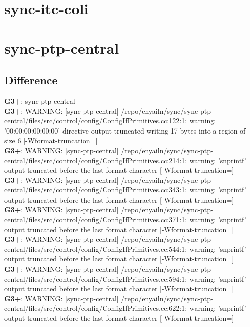 \documentclass[12pt,twoside]{article}
\begin{document}
\section{sync-itc-coli} 
  
\section{sync-ptp-central} 
\subsection{Difference} 
  
\textbf{G3+}: sync-ptp-central\\ 
\textbf{G3+}: WARNING: [sync-ptp-central] /repo/enyailn/sync/sync-ptp-central/files/src/control/config/ConfigIfPrimitives.cc:122:1: warning: '00:00:00:00:00:00' directive output truncated writing 17 bytes into a region of size 6 [-Wformat-truncation=]\\ 
\textbf{G3+}: WARNING: [sync-ptp-central] /repo/enyailn/sync/sync-ptp-central/files/src/control/config/ConfigIfPrimitives.cc:214:1: warning: 'snprintf' output truncated before the last format character [-Wformat-truncation=]\\ 
\textbf{G3+}: WARNING: [sync-ptp-central] /repo/enyailn/sync/sync-ptp-central/files/src/control/config/ConfigIfPrimitives.cc:343:1: warning: 'snprintf' output truncated before the last format character [-Wformat-truncation=]\\ 
\textbf{G3+}: WARNING: [sync-ptp-central] /repo/enyailn/sync/sync-ptp-central/files/src/control/config/ConfigIfPrimitives.cc:371:1: warning: 'snprintf' output truncated before the last format character [-Wformat-truncation=]\\ 
\textbf{G3+}: WARNING: [sync-ptp-central] /repo/enyailn/sync/sync-ptp-central/files/src/control/config/ConfigIfPrimitives.cc:544:1: warning: 'snprintf' output truncated before the last format character [-Wformat-truncation=]\\ 
\textbf{G3+}: WARNING: [sync-ptp-central] /repo/enyailn/sync/sync-ptp-central/files/src/control/config/ConfigIfPrimitives.cc:594:1: warning: 'snprintf' output truncated before the last format character [-Wformat-truncation=]\\ 
\textbf{G3+}: WARNING: [sync-ptp-central] /repo/enyailn/sync/sync-ptp-central/files/src/control/config/ConfigIfPrimitives.cc:622:1: warning: 'snprintf' output truncated before the last format character [-Wformat-truncation=]\\ 
\end{document}

